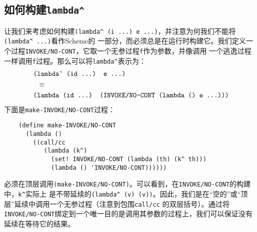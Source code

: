 \documentclass[12pt]{article}
\begin{document}
\subsection{如何构建\texttt{lambda\^{}}}
\indent{}让我们来考虑如何构建\texttt{(lambda\^{} (i ...) e ...)}，并注意为何我们不能将\texttt{(lambda\^{} ...)}看作Scheme的
一部分，而必须总是在运行时构建它。我们定义一个过程\texttt{INVOKE/NO-CONT}，它取一个无参过程\texttt{f}作为参数，并像调用
一个逃逸过程一样调用\texttt{f}过程。那么可以将\texttt{lambda\^{}}表示为：
\begin{align*}
&\textrm{\texttt{(lambda\^{} (id ...) e ...)}}\\ &\;\;\equiv \\
&\textrm{\texttt{(lambda (id ...) (INVOKE/NO-CONT (lambda () e ...)))}}
\end{align*}
\noindent{}下面是\texttt{make-INVOKE/NO-CONT}过程：
\begin{verbatim}
    (define make-INVOKE/NO-CONT
      (lambda ()
        ((call/cc
           (lambda (k^)
             (set! INVOKE/NO-CONT (lambda (th) (k^ th)))
             (lambda () 'INVOKE/NO-CONT))))))
\end{verbatim}
\indent{}必须在顶层调用\texttt{(make-INVOKE/NO-CONT)}。可以看到，在\texttt{INVOKE/NO-CONT}的构建中，\texttt{k\^{}}实际上
是不带延续的\texttt{(lambda\^{} (v) (v))}。因此，我们是在“空的”或“顶层”延续中调用一个无参过程（注意到包围\texttt{call/cc}
的双层括号）。通过将\texttt{INVOKE/NO-CONT}绑定到一个唯一目的是调用其参数的过程上，我们可以保证没有延续在等待它的结果。
\end{document}
